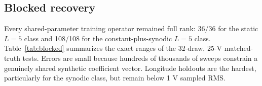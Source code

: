 \documentclass[11pt]{article}
\begin{document}
\begin{table}[ht]
\centering
\caption{Out-of-basis cap diagnostics over 560 daily windows.  Errors are V.}
\label{tab:caps}
\end{table}

\subsection{Blocked recovery}

Every shared-parameter training operator remained full rank: 36/36 for the
static $L=5$ class and 108/108 for the constant-plus-synodic $L=5$ class.
Table~\ref{tab:blocked} summarizes the exact ranges of the 32-draw, 25-V
matched-truth tests.  Errors are small because hundreds of thousands of sweeps
constrain a genuinely shared synthetic coefficient vector.  Longitude
holdouts are the hardest, particularly for the synodic class, but remain below
1 V sampled RMS.
\end{document}
